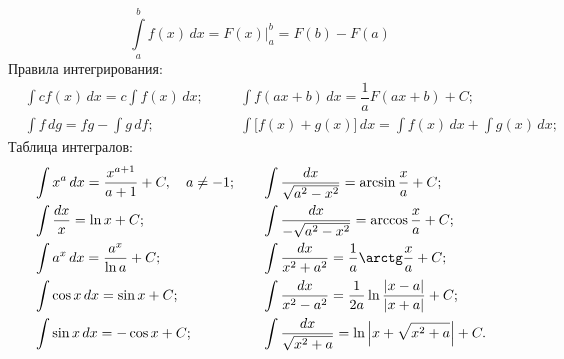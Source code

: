 \begin{equation}
	\int\limits^b_a f(x)\,dx = F(x) \biggr|^b_a = F(b) - F(a)
\end{equation}
Правила интегрирования:
\begin{align*}
	&\int c f(x) \,dx = c \int f(x) \,dx;\quad &&  \int f(ax + b) \,dx = \dfrac{1}{a}F(ax + b) + C;\\
	&\int f \,dg = fg - \int g \,df; && \int \bigl[f(x) + g(x)\bigr] \,dx = \int f(x) \,dx + \int g(x) \,dx;
\end{align*}
Таблица интегралов:
\begin{align*}
	&\int  x^a \,dx = \dfrac{x^{a+1}}{a+1} + C,\quad a \neq -1; \quad
	&&\int \dfrac{dx}{\sqrt{a^2 - x^2}} = \arcsin\dfrac{x}{a} + C;\\
	&\int \frac{dx}{x} = \ln x + C;
	&&\int \dfrac{dx}{-\sqrt{a^2 - x^2}} = \arccos\dfrac{x}{a} + C;\\
	&\int a^x \,dx = \dfrac{a^x}{\ln a} + C;
	&&\int \dfrac{dx}{x^2 + a^2} = \dfrac{1}{a} \arctg \dfrac{x}{a} + C; \\
	&\int \cos x \,dx = \sin x + C;
	&&\int \dfrac{dx}{x^2 - a^2} = \dfrac{1}{2a} \ln \dfrac{|x - a|}{|x + a|} + C;\\
	&\int \sin x \,dx = -\cos x + C;
	&&\int \dfrac{dx}{\sqrt{x^2 + a}} = \ln \left| x + \sqrt{x^2 + a} \right| + C.
\end{align*}
